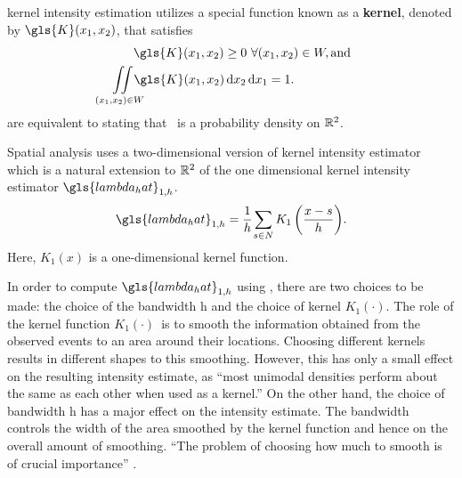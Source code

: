 \gls{kernel intensity estimation} utilizes a special function known as a \textbf{\gls{kernel}},
denoted by $\gls{K}\xvec$,
that satisfies
\begin{align}
    & \hspace{1.75em} \gls{K}\xvec \ge 0~ \forall \xvec \in W, \text{and} \label{eq:k_pos} \\%
    & \iintW{\gls{K}\xvec} = 1 \text{.} \label{eq:k_1}%
\end{align}
 are equivalent to stating that \Kdots~is a probability density on $\mathbb{R}^2$.

Spatial analysis uses a two-dimensional version of \gls{kernel intensity estimator}
which is a natural extension to $\mathbb{R}^2$ of the one dimensional \gls{kernel intensity estimator} $\gls{lambda_hat}_{1,h}$.
\begin{equation}
    \label{eq:lambda_hat_1}
    \gls{lambda_hat}_{1,h} = \sumSone{K_1\left( \frac{x - s}{h} \right)} \text{.}%
\end{equation}
Here, $K_1(x)$ is a one-dimensional kernel function.

In order to compute $\gls{lambda_hat}_{1,h}$ using ,
there are two choices to be made: the choice of the bandwidth \gls{h}
and the choice of \gls{kernel} $K_1(\cdot)$.
The role of the \gls{kernel} function $K_1(\cdot)$~is to smooth the information obtained
from the observed \glspl{event} to an area around their locations.
Choosing different \glspl{kernel} results in different shapes to this smoothing.
However, this has only a small effect on the resulting \gls{intensity} estimate, as
``most unimodal densities perform about the same as each other when used as a kernel.'' \citep[p. 31]{wand1994kernel}
On the other hand,
the choice of bandwidth \gls{h} has a major effect on the \gls{intensity} estimate.
The bandwidth controls the width of the area smoothed by the \gls{kernel} function and hence on the overall amount of smoothing.
``The problem of choosing how much to smooth is of crucial importance'' \citep[p. 43]{silverman1986density}.

